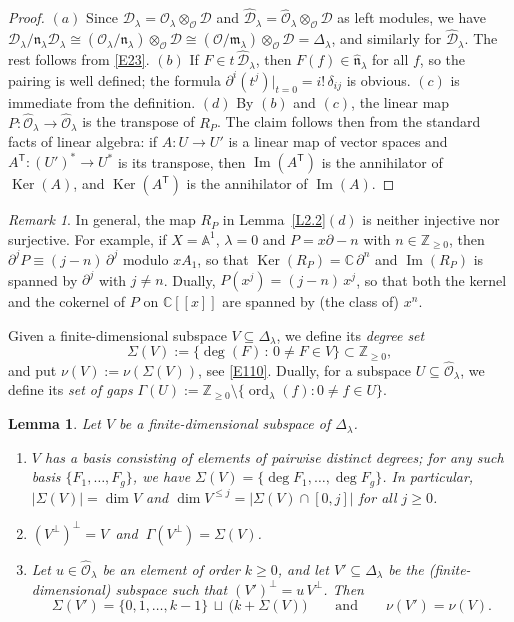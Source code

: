 \documentclass[11pt,reqno]{amsart}
\theoremstyle{plain}
\newtheorem{lemma}{Lemma}[section]
\theoremstyle{definition}
\theoremstyle{remark}
\newtheorem*{remark}{Remark}
\numberwithin{equation}{section}
\newcommand{\cD}{\mathcal{D}}
\newcommand{\cO}{\mathcal{O}}
\newcommand{\C}{\mathbb{C}}
\newcommand{\Z}{\mathbb{Z}}
\newcommand{\A}{\mathbb{A}}
\newcommand{\del}{\partial}
\newcommand{\fn}{\mathfrak{n}}
\newcommand{\ml}{\mathfrak{m}_\lambda}
\newcommand{\nl}{\mathfrak{n}_\lambda}
\newcommand{\hO}{\widehat{\cO}}
\newcommand{\hD}{\widehat{\cD}}
\newcommand{\hn}{\widehat{\fn}}
\newcommand{\Dl}{\Delta_\lambda}
\DeclareMathOperator{\Ker}{Ker}
\DeclareMathOperator{\im}{Im}
\DeclareMathOperator{\ord}{ord}
\begin{document}
\begin{proof}
$(a)$ Since $\cD_\lambda = \cO_\lambda \otimes_{\cO} \cD$ and $\hD_\lambda = \hO_\lambda
\otimes_{\cO} \cD$ as left modules, we have $\cD_\lambda/\nl \cD_\lambda \cong (\cO_\lambda/\nl)
\otimes_{\cO} \cD \cong (\cO/\ml) \otimes_{\cO} \cD = \Dl$, and similarly for $\hD_\lambda$. The
rest follows from \eqref{E23}. $(b)$ If $F \in t\, \hD_\lambda$, then $F(f) \in \hn_\lambda$ for
all $f$, so the pairing is well defined; the formula $\del^i(t^j)|_{t=0} = i!\,\delta_{ij}$ is
obvious. $(c)$ is immediate from the definition. $(d)$ By $(b)$ and $(c)$, the linear map
$P: \hO_\lambda \to \hO_\lambda$ is the transpose of $R_P$. The claim follows then from the
standard facts of linear algebra: if $A: U \to U'$ is a linear map of vector spaces and
$A^{\mathsf{T}} : (U')^* \to U^*$ is its transpose, then $\im(A^{\mathsf{T}})$ is the annihilator
of $\Ker(A)$, and $\Ker(A^{\mathsf{T}})$ is the annihilator of $\im(A)$.
\end{proof}

\begin{remark}
In general, the map $R_P$ in Lemma~\ref{L2.2}$(d)$ is neither injective nor surjective. For
example, if $X = \A^1$, $\lambda = 0$ and $P = x \del - n$ with $n \in \Z_{\ge 0}$, then
$\del^j P \equiv (j - n)\, \del^j$ modulo $x A_1$, so that $\Ker(R_P) = \C\,\del^n$ and
$\im(R_P)$ is spanned by $\del^j$ with $j \ne n$. Dually, $P(x^j) = (j - n)\, x^j$, so that both
the kernel and the cokernel of $P$ on $\C[[x]]$ are spanned by (the class of) $x^n$.
\end{remark}

Given a finite-dimensional subspace $V \subseteq \Dl$, we define its \emph{degree set}
\[
  \Sigma(V) := \{ \deg(F) \, : \, 0 \ne F \in V \} \subset \Z_{\ge 0} ,
\]
and put $\nu(V) := \nu(\Sigma(V))$, see \eqref{E110}. Dually, for a subspace
$U \subseteq \hO_\lambda$, we define its \emph{set of gaps}
$\Gamma(U) := \Z_{\ge 0} \setminus \{ \ord_\lambda(f) : 0 \ne f \in U \}$.

\begin{lemma}
\label{L2.3}
Let $V$ be a finite-dimensional subspace of $\Dl$.
\begin{enumerate}
\item[$(a)$] $V$ has a basis consisting of elements of pairwise distinct degrees; for any such
basis $\{F_1, \ldots, F_g\}$, we have $\Sigma(V) = \{\deg F_1, \ldots, \deg F_g\}$. In particular,
$|\Sigma(V)| = \dim V$ and $\dim V^{\le j} = |\Sigma(V) \cap [0, j]|$ for all $j \ge 0$.
\item[$(b)$] $(V^\perp)^\perp = V\,$ and $\ \Gamma(V^\perp) = \Sigma(V)$.
\item[$(c)$] Let $u \in \hO_\lambda$ be an element of order $k \ge 0$, and let $V' \subseteq \Dl$ be
the (finite-dimensional) subspace such that $(V')^\perp = u\, V^\perp$. Then
\[
  \Sigma(V') = \{0, 1, \ldots, k-1\} \, \sqcup\, \bigl(k + \Sigma(V)\bigr) \qquad \text{and} \qquad
  \nu(V') = \nu(V) .
\]
\end{enumerate}
\end{lemma}
\end{document}
